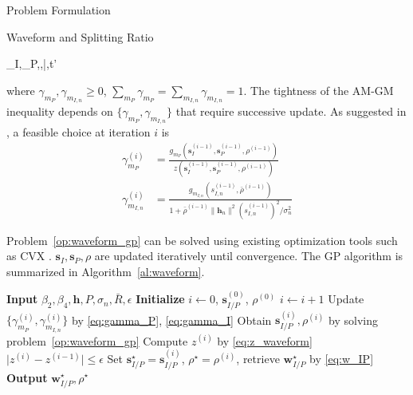 \documentclass[journal]{IEEEtran}
\begin{document}
\begin{section}{Problem Formulation}
\begin{subsection}{Waveform and Splitting Ratio}
			\begin{mini}
				{\boldsymbol{s}_I,_P,\rho,\bar{\rho},t'}{}{\label{op:waveform_gp}}{}
			\end{mini}
			where $\gamma_{m_P},\gamma_{m_{I,n}} \ge 0$, $\sum_{m_P}\gamma_{m_P}=\sum_{m_{I,n}}\gamma_{m_{I,n}}=1$. The tightness of the AM-GM inequality depends on $\{\gamma_{m_P},\gamma_{m_{I,n}}\}$ that require successive update. As suggested in \cite{Clerckx2018b}, a feasible choice at iteration $i$ is
			\begin{align}
				\gamma_{m_P}^{(i)} & = \frac{g_{m_P}(\boldsymbol{s}_I^{(i-1)},\boldsymbol{s}_P^{(i-1)},\rho^{(i-1)})}{z(\boldsymbol{s}_I^{(i-1)},\boldsymbol{s}_P^{(i-1)},\rho^{(i-1)})}\label{eq:gamma_P}\\
				\gamma_{m_{I,n}}^{(i)} & = \frac{g_{m_{I,n}}(s_{I,n}^{(i-1)},\bar{\rho}^{(i-1)})}{1+{\bar{\rho}^{(i-1)}\lVert{\boldsymbol{h}_n}\rVert^2 (s_{I,n}^{(i-1)})^2}/{\sigma_n^2}}\label{eq:gamma_I}
			\end{align}

			Problem~\ref{op:waveform_gp} can be solved using existing optimization tools such as CVX \cite{Grant2013}. $\boldsymbol{s}_I,\boldsymbol{s}_P,\rho$ are updated iteratively until convergence. The GP algorithm is summarized in Algorithm~\ref{al:waveform}.
			\begin{algorithm}[!t]
				\caption{GP: Waveform and Splitting Ratio}
				\label{al:waveform}
				\begin{algorithmic}[1]
					\State \textbf{Input} $\beta_2,\beta_4,\boldsymbol{h},P,\sigma_n,\bar{R},\epsilon$
					\State \textbf{Initialize} $i \gets 0$, $\boldsymbol{s}_{I/P}^{(0)}$, $\rho^{(0)}$
					\Repeat
						\State $i \gets i + 1$
						\State Update $\{\gamma_{m_P}^{(i)},\gamma_{m_{I,n}}^{(i)}\}$ by \ref{eq:gamma_P}, \ref{eq:gamma_I}
						\State Obtain $\boldsymbol{s}_{I/P}^{(i)},\rho^{(i)}$ by solving problem~\ref{op:waveform_gp}
						\State Compute $z^{(i)}$ by \ref{eq:z_waveform}
					\Until $\lvert z^{(i)} - z^{(i-1)} \rvert \le \epsilon$
					\State Set $\boldsymbol{s}_{I/P}^{\star}=\boldsymbol{s}_{I/P}^{(i)}$, $\rho^{\star}=\rho^{(i)}$, retrieve $\boldsymbol{w}_{I/P}^{\star}$ by \ref{eq:w_IP}
					\State \textbf{Output} $\boldsymbol{w}_{I/P}^{\star}, \rho^{\star}$
				\end{algorithmic}
			\end{algorithm}
		\end{subsection}



\end{section}
\end{document}
